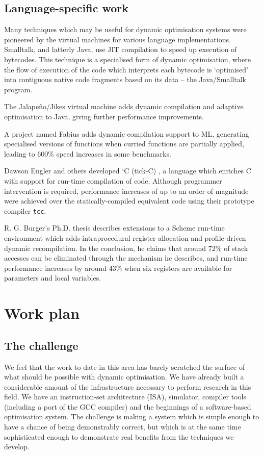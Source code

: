 \documentclass[11pt,letterpaper,onecolumn,notitlepage]{article}
\begin{document}
\subsection{Language-specific work}

Many techniques which may be useful for dynamic optimisation systems were pioneered by the virtual machines for various language implementations. Smalltalk, and latterly Java, use JIT compilation to speed up execution of bytecodes. This technique is a specialised form of dynamic optimisation, where the flow of execution of the code which interprets each bytecode is `optimised' into contiguous native code fragments based on its data -- the Java/Smalltalk program.

The Jalape\~{n}o/Jikes virtual machine \cite{Jalapeno} adds dynamic compilation and adaptive optimisation to Java, giving further performance improvements.

A project named Fabius \cite{Fabius} adds dynamic compilation support to ML, generating specialised versions of functions when curried functions are partially applied, leading to 600\% speed increases in some benchmarks.

Dawson Engler and others developed `C (tick-C) \cite{tcc}, a language which enriches C with support for run-time compilation of code. Although programmer intervention is required, performance increases of up to an order of magnitude were achieved over the statically-compiled equivalent code using their prototype compiler {\tt tcc}.

R. G. Burger's Ph.D. thesis \cite{DoScheme} describes extensions to a Scheme run-time environment which adds intraprocedural register allocation and profile-driven dynamic recompilation. In the conclusion, he claims that around 72\% of stack accesses can be eliminated through the mechanism he describes, and run-time performance increases by around 43\% when six registers are available for parameters and local variables.

\section{Work plan}

\subsection{The challenge}

We feel that the work to date in this area has barely scratched the surface of what should be possible with dynamic optimisation. We have already built a considerable amount of the infrastructure necessary to perform research in this field. We have an instruction-set architecture (ISA), simulator, compiler tools (including a port of the GCC compiler) and the beginnings of a software-based optimisation system. The challenge is making a system which is simple enough to have a chance of being demonstrably correct, but which is at the same time sophisticated enough to demonstrate real benefits from the techniques we develop.
\end{document}
